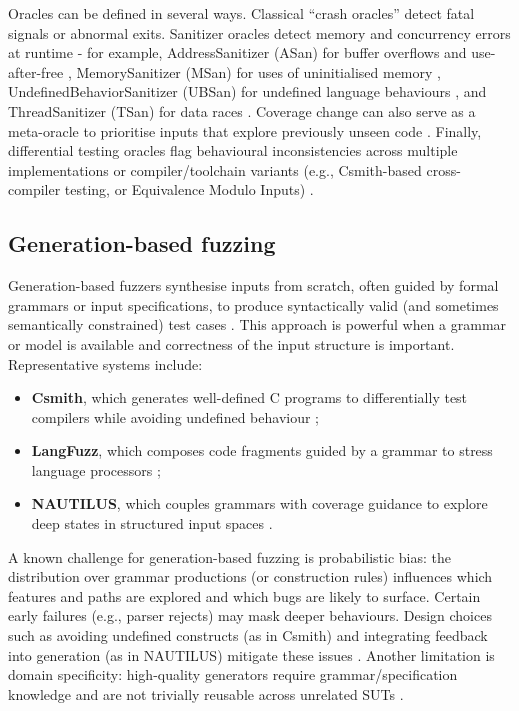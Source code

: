 Oracles can be defined in several ways. Classical ``crash oracles'' detect fatal signals or abnormal exits. Sanitizer oracles detect memory and concurrency errors at runtime - for example, AddressSanitizer (ASan) for buffer overflows and use-after-free \cite{serebryany_2012_addresssanitizer}, MemorySanitizer (MSan) for uses of uninitialised memory \cite{llvmproject_2015_memorysanitizer}, UndefinedBehaviorSanitizer (UBSan) for undefined language behaviours \cite{llvmproject_2015_undefinedbehaviorsanitizer}, and ThreadSanitizer (TSan) for data races \cite{serebryany_2009_threadsanitizer}. Coverage change can also serve as a meta-oracle to prioritise inputs that explore previously unseen code \cite{bhme_2016_coveragebased,serebryany_2016_libfuzzer}. Finally, differential testing oracles flag behavioural inconsistencies across multiple implementations or compiler/toolchain variants (e.g., Csmith-based cross-compiler testing, or Equivalence Modulo Inputs) \cite{yang_2011_finding,le_2014_compiler}.

\subsection{Generation-based fuzzing}

Generation-based fuzzers synthesise inputs from scratch, often guided by formal grammars or input specifications, to produce syntactically valid (and sometimes semantically constrained) test cases \cite{aschermann_2019_nautilus,holler_2012_fuzzing}. This approach is powerful when a grammar or model is available and correctness of the input structure is important. Representative systems include:

\begin{itemize}
    \item \textbf{Csmith}, which generates well-defined C programs to differentially test compilers while avoiding undefined behaviour \cite{yang_2011_finding};
    \item \textbf{LangFuzz}, which composes code fragments guided by a grammar to stress language processors \cite{holler_2012_fuzzing};
    \item \textbf{NAUTILUS}, which couples grammars with coverage guidance to explore deep states in structured input spaces \cite{aschermann_2019_nautilus}.
\end{itemize}

A known challenge for generation-based fuzzing is probabilistic bias: the distribution over grammar productions (or construction rules) influences which features and paths are explored and which bugs are likely to surface. Certain early failures (e.g., parser rejects) may mask deeper behaviours. Design choices such as avoiding undefined constructs (as in Csmith) and integrating feedback into generation (as in NAUTILUS) mitigate these issues \cite{yang_2011_finding,aschermann_2019_nautilus}. Another limitation is domain specificity: high-quality generators require grammar/specification knowledge and are not trivially reusable across unrelated SUTs \cite{holler_2012_fuzzing}.

